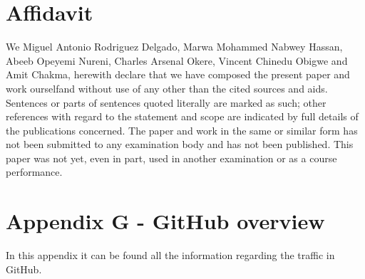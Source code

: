 \documentclass[10pt,journal,compsoc]{IEEEtran}
\begin{document}
\section{Affidavit}

We Miguel Antonio Rodriguez Delgado, Marwa Mohammed Nabwey Hassan, Abeeb Opeyemi Nureni, Charles Arsenal Okere, Vincent Chinedu Obigwe and Amit Chakma, herewith declare that we have composed the present paper and work ourselfand without use of any other than the cited sources and aids. Sentences or parts of sentences quoted literally are marked as such; other references with regard to the statement and scope are indicated by full details of the publications concerned. The paper and work in the same or similar form has not been submitted to any examination body and has not been published. This paper was not yet, even in part, used in another examination or as a course performance.


\section{Appendix G - GitHub overview}

In this appendix it can be found all the information regarding the traffic in GitHub.




\end{document}
